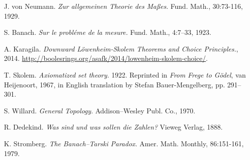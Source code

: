 \documentclass[12pt,a4paper]{report}
\theoremstyle{definition}
\theoremstyle{num.custom-title}
\begin{document}
\begin{thebibliography}{3}
J. von Neumann. \emph{Zur allgemeinen Theorie des Maßes.} Fund. Math., 30:73-116, 1929.

S. Banach. \emph{Sur le probléme de la mesure.} Fund. Math., 4:7–33, 1923.

A. Karagila. \emph{Downward Löwenheim-Skolem Theorems and Choice Principles.}, 2014. \url{http://boolesrings.org/asafk/2014/lowenheim-skolem-choice/}.

T. Skolem. \emph{Axiomatized set theory.} 1922. Reprinted in \emph{From Frege to Gödel}, van Heijenoort, 1967, in English translation by Stefan Bauer-Mengelberg, pp. 291–301.

S. Willard. \emph{General Topology.} Addison–Wesley Publ. Co., 1970.

R. Dedekind. \emph{Was sind und was sollen die Zahlen?} Vieweg Verlag, 1888.

K. Stromberg. \emph{The Banach–Tarski Paradox.} Amer. Math. Monthly, 86:151-161, 1979.

\end{thebibliography}
\end{document}
